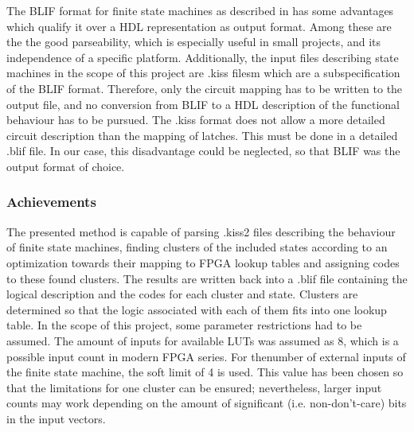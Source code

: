 The BLIF format for finite state machines as described in \cite{blif} has some advantages which qualify it over a HDL representation as output format. Among these are the the good parseability, which is especially useful in small projects, and its independence of a specific platform.
Additionally, the input files describing state machines in the scope of this project are .kiss filesm which are a subspecification of the BLIF format. Therefore, only the circuit mapping has to be written to the output file, and no conversion from BLIF to a HDL description of the functional behaviour has to be pursued. The .kiss format does not allow a more detailed circuit description than the mapping of latches. This must be done in a detailed .blif file. In our case, this disadvantage could be neglected, so that BLIF was the output format of choice.

\subsubsection{Achievements}
\label{subsubsec:Achievements}

The presented method is capable of parsing .kiss2 files describing the behaviour of finite state machines, finding clusters of the included states
according to an optimization towards their mapping to FPGA lookup tables and assigning codes to these found clusters. The results are written back into a .blif file containing the logical description and the codes for each cluster and state. Clusters are determined so that the logic associated with each of them fits into one lookup table. In the scope of this project, some parameter restrictions had to be assumed. The amount of inputs for available LUTs was assumed as 8, which is a possible input count in modern FPGA series. For thenumber of external inputs of the finite state machine, the soft limit of 4 is used. This value has been chosen so that the limitations for one cluster can be ensured; nevertheless, larger input counts may work depending on the amount of significant (i.e. non-don't-care) bits in the input vectors.
